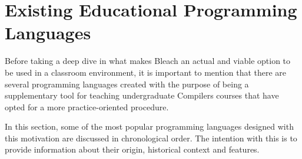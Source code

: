 \section{Existing Educational Programming Languages}

Before taking a deep dive in what makes Bleach an actual and viable option to be used in a classroom environment, it is important to mention that there are several programming languages created with the purpose of being a supplementary tool for teaching undergraduate Compilers courses that have opted for a more practice-oriented procedure.

In this section, some of the most popular programming languages designed with this motivation are discussed in chronological order. The intention with this is to provide information about their origin, historical context and features.


